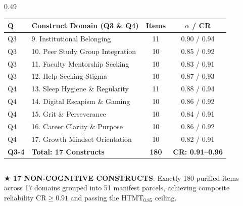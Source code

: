 \documentclass[aspectratio=169, 10pt]{beamer}
\begin{document}
\begin{frame}
\begin{columns}[T]
\begin{column}{0.49\textwidth}
\begin{tcolorbox}[colback=white, colframe=BluePrimary, arc=1.5mm, boxrule=0.8pt, top=0.5mm, bottom=0.5mm, left=1mm, right=1mm]
        \centering\fontsize{6.2pt}{7.5pt}\selectfont
        \begin{tabularx}{\textwidth}{llcc}
          \toprule
          \textbf{Q} & \textbf{Construct Domain (Q3 \& Q4)} & \textbf{Items} & \textbf{$\alpha$ / CR} \\
          \midrule
          \rowcolor{BlueLight} Q3 & 9. Institutional Belonging & 11 & 0.90 / 0.94 \\
          \rowcolor{BlueLight} Q3 & 10. Peer Study Group Integration & 10 & 0.85 / 0.92 \\
          \rowcolor{BlueLight} Q3 & 11. Faculty Mentorship Seeking & 10 & 0.83 / 0.91 \\
          \rowcolor{BlueLight} Q3 & 12. Help-Seeking Stigma & 10 & 0.87 / 0.93 \\
          \midrule
          \rowcolor{CanvasBG} Q4 & 13. Sleep Hygiene \& Regularity & 11 & 0.88 / 0.94 \\
          \rowcolor{CanvasBG} Q4 & 14. Digital Escapism \& Gaming & 10 & 0.86 / 0.92 \\
          \rowcolor{CanvasBG} Q4 & 15. Grit \& Perseverance & 10 & 0.84 / 0.91 \\
          \rowcolor{CanvasBG} Q4 & 16. Career Clarity \& Purpose & 10 & 0.86 / 0.92 \\
          \rowcolor{CanvasBG} Q4 & 17. Growth Mindset Orientation & 10 & 0.82 / 0.91 \\
          \midrule
          \textbf{Q3-4} & \textbf{Total: 17 Constructs} & \textbf{180} & \textbf{CR: 0.91--0.96} \\
          \bottomrule
        \end{tabularx}
      \end{tcolorbox}
    \end{column}
  \end{columns}
  \vspace{-0.1cm}

  \begin{takeawaybanner}
    \textbf{\color{GoldPill}$\bigstar$ 17 NON-COGNITIVE CONSTRUCTS}: Exactly 180 purified items across 17 domains grouped into 51 manifest parcels, achieving composite reliability $\text{CR} \ge 0.91$ and passing the $\text{HTMT}_{0.85}$ ceiling.
  \end{takeawaybanner}
\end{frame}

\end{document}
